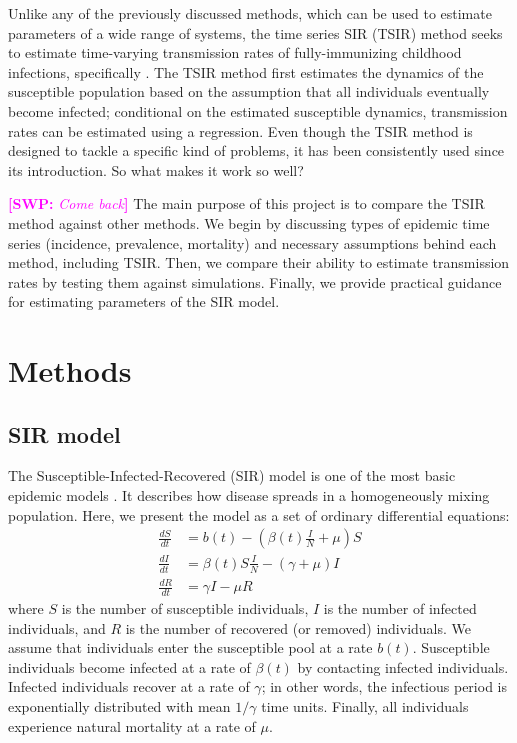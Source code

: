 \documentclass{article}
\newcommand{\comment}[3]{\textcolor{#1}{\textbf{[#2: }\textsl{#3}\textbf{]}}}
\newcommand{\swp}[1]{\comment{magenta}{SWP}{#1}}
\begin{document}
Unlike any of the previously discussed methods, which can be used to estimate parameters of a wide range of systems, the time series SIR (TSIR) method seeks to estimate time-varying transmission rates of fully-immunizing childhood infections, specifically \citep{finkenstadt2000time}.
The TSIR method first estimates the dynamics of the susceptible population based on the assumption that all individuals eventually become infected;
conditional on the estimated susceptible dynamics, transmission rates can be estimated using a regression. 
Even though the TSIR method is designed to tackle a specific kind of problems, it has been consistently used since its introduction.
So what makes it work so well?

\swp{Come back}
The main purpose of this project is to compare the TSIR method against other methods.
We begin by discussing types of epidemic time series (incidence, prevalence, mortality) and necessary assumptions behind each method, including TSIR.
Then, we compare their ability to estimate transmission rates by testing them against simulations.
Finally, we provide practical guidance for estimating parameters of the SIR model.

\section{Methods}

\subsection{SIR model}

The Susceptible-Infected-Recovered (SIR) model is one of the most basic epidemic models \citep{kermack1927contribution}.
It describes how disease spreads in a homogeneously mixing population.
Here, we present the model as a set of ordinary differential equations:
\begin{equation}\label{eq:sir}
\begin{aligned}
\frac{dS}{dt} &= b(t) - \left(\beta(t) \frac{I}{N} + \mu \right) S\\
\frac{dI}{dt} &= \beta(t) S \frac{I}{N} - (\gamma + \mu) I\\
\frac{dR}{dt} &= \gamma I - \mu R
\end{aligned}
\end{equation}
where $S$ is the number of susceptible individuals, $I$ is the number of infected individuals, and $R$ is the number of recovered (or removed) individuals.
We assume that individuals enter the susceptible pool at a rate $b(t)$.
Susceptible individuals become infected at a rate of $\beta(t)$ by contacting infected individuals.
Infected individuals recover at a rate of $\gamma$;
in other words, the infectious period is exponentially distributed with mean $1/\gamma$ time units.
Finally, all individuals experience natural mortality at a rate of $\mu$.
\end{document}
